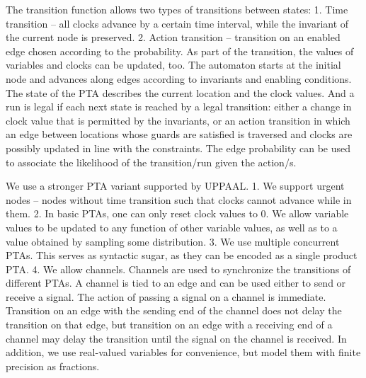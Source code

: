 \documentclass[letterpaper]{article}
\begin{document}
The transition function allows two types of transitions between states: 1. Time transition -- all clocks advance by a certain time interval, while the invariant of the current node is preserved. 2. Action transition -- transition on an enabled edge chosen according to the probability. As part of the transition, the values of variables and clocks can be updated, too. The automaton starts at the initial node and advances along edges according to invariants and enabling conditions. The state of the PTA describes the current location and the clock values. And a run is legal if each next state is reached by a legal transition: either a change in clock value that is permitted by the invariants, or an action transition in which an edge between locations
whose guards are satisfied is traversed and clocks are possibly updated in line with the constraints. The edge probability can be used to associate the likelihood of the transition/run given the action/s.



We use a stronger  PTA variant
supported by UPPAAL. 1. We support urgent nodes -- nodes without time transition such that clocks cannot advance while in them. 2. In basic PTAs, one can only reset clock values to 0. We allow variable values to be updated to any function of other variable values, as well as to a value obtained by sampling some distribution. 3. We use multiple concurrent PTAs. This serves as syntactic sugar,
as they can be encoded as a single product PTA. 4. We allow channels. Channels are used to synchronize the transitions of different PTAs. A channel is tied to an edge and can be used either to send or receive a signal. The action of passing a signal on a channel is immediate. Transition on an edge with the sending end of the channel does not delay the transition on that edge, but transition on an edge with a receiving end of a channel may delay the transition until the signal on the channel is received. In addition, we use real-valued variables for convenience, but model them with finite precision as fractions.
\end{document}
